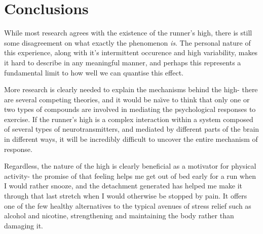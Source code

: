 \documentclass[twocolumn]{article}
\begin{document}
\section{Conclusions}

	While most research agrees with the existence of the runner's high, there is still some disagreement on what exactly the phenomenon \emph{is}. The personal nature of this experience, along with it's intermittent occurence and high variability, makes it hard to describe in any meaningful manner, and perhaps this represents a fundamental limit to how well we can quantise this effect.
	
	More research is clearly needed to explain the mechanisms behind the high- there are several competing theories, and it would be na\"{\i}ve to think that only one or two types of compounds are involved in mediating the psychological responses to exercise. If the runner's high is a complex interaction within a system composed of several types of neurotransmitters, and mediated by different parts of the brain in different ways, it will be incredibly difficult to uncover the entire mechanism of response.
	
	Regardless, the nature of the high is clearly beneficial as a motivator for physical activity- the promise of that feeling helps me get out of bed early for a run when I would rather snooze, and the detachment generated has helped me make it through that last stretch when I would otherwise be stopped by pain. It offers one of the few healthy alternatives to the typical avenues of stress relief such as alcohol and nicotine, strengthening and maintaining the body rather than damaging it.



\end{document}
